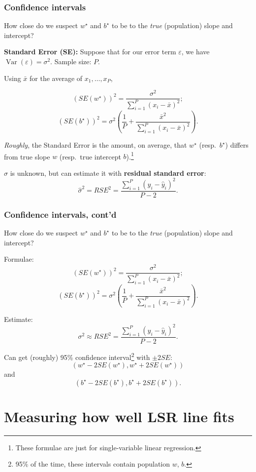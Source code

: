 \documentclass{beamer}
\theoremstyle{example}
\begin{document}
\begin{frame}
\frametitle{Confidence intervals}
How close do we suspect $w^\star$ and $b^\star$ to be to the \emph{true} (population) slope and intercept?

\pause
\textbf{Standard Error (SE):}  Suppose that for our error term $\varepsilon$, we have $\operatorname{Var}(\varepsilon) = \sigma^2$. Sample size: $P$.

\pause
Using $\bar{x}$ for the average of $x_1,\ldots,x_P$,

\[(SE(w^\star))^2 = \frac{\sigma^2}{\sum_{i=1}^P(x_i - \bar{x})^2};\]
\[(SE(b^\star))^2 = \sigma^2\left(\frac1{P} + \frac{\bar{x}^2}{\sum_{i=1}^P(x_i - \bar{x})^2}\right).\]

\pause
\emph{Roughly}, the Standard Error is the amount, on average, that $w^\star$ (resp.\ $b^\star$) differs from true slope $w$ (resp.\ true intercept $b$).\footnote{These formulae are just for single-variable linear regression.}

\pause
$\sigma$ is unknown, but can estimate it with \textbf{residual standard error}:
    \[\hat{\sigma}^2 = RSE^2 = \frac{\sum_{i=1}^P(y_i - \hat{y}_i)^2}{P-2}.\]

\end{frame}


\begin{frame}
    \frametitle{Confidence intervals, cont'd}
    How close do we suspect $w^\star$ and $b^\star$ to be to the \emph{true} (population) slope and intercept?
    
    Formulae: 
    \[(SE(w^\star))^2 = \frac{\sigma^2}{\sum_{i=1}^P(x_i - \bar{x})^2};\]
    \[(SE(b^\star))^2 = \sigma^2\left(\frac1{P} + \frac{\bar{x}^2}{\sum_{i=1}^P(x_i - \bar{x})^2}\right).\]
    
    Estimate:
        \[\sigma^2 \approx RSE^2 = \frac{\sum_{i=1}^P(y_i - \hat{y}_i)^2}{P-2}.\]
    
        \pause
    Can get (roughly) 95\% confidence interval\footnote{95\% of the time, these intervals contain population $w$, $b$.} with $\pm 2SE$: 
        \[(w^\star - 2SE(w^\star), w^\star + 2SE(w^\star))\]
    and 
        \[(b^\star - 2SE(b^\star), b^\star + 2SE(b^\star)).\]
    
\end{frame}

\section{Measuring how well LSR line fits}
\end{document}
